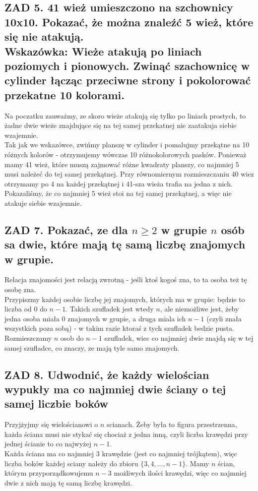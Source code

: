 \documentclass{article}
\begin{document}
\subsection*{ZAD 5. 41 wież umieszczono na szchownicy 10x10. Pokazać, że można znaleźć 5 wież, które się nie atakują.\\Wskazówka: Wieże atakują po liniach poziomych i pionowych. Zwinąć szachownicę w cylinder łącząc przeciwne strony i pokolorować przekatne 10 kolorami.}
Na poczatku zauważmy, ze skoro wieże atakują się tylko po liniach prostych, to żadne dwie wieże znajdujące się na tej samej przekatnej nie zaatakuja siebie wzajemnie.\\
Tak jak we wskazówce, zwińmy planszę w cylinder i pomalujmy przekątne na 10 różnych kolorów - otrzymujemy wówczas 10 różnokolorowych pasków. Ponieważ mamy 41 wież, które muszą zajmować różne kwadraty planszy, co najmniej 5 musi należeć do tej samej przekątnej. Przy równomiernym rozmieszczaniu 40 wiez otrzymamy po 4 na każdej przekątnej i 41-sza wieża trafia na jedna z nich.\\
Pokazaliśmy, że co najmniej 5 wież stoi na tej samej przekątnej, a więc nie atakuje siebie wzajemnie.
\newpage
\subsection*{ZAD 7. Pokazać, ze dla $n\geq2$ w grupie $n$ osób sa dwie, które mają tę samą liczbę znajomych w grupie.}
  Relacja znajomości jest relacją zwrotną - jeśli ktoś kogoś zna, to ta osoba też tę osobę zna.\\
  Przypiszmy każdej osobie liczbę jej znajomych, których ma w grupie: będzie to liczba od 0 do $n-1$. Takich szufladek jest wtedy $n$, ale niemożliwe jest, żeby jedna osoba miała 0 znajomych w grupie, a druga miala ich $n-1$ (czyli znała wszystkich poza sobą) - w takim razie ktoraś z tych szufladek bedzie pusta. \\
  Rozmieszczamy $n$ osob do $n-1$ szufladek, wiec co najmniej dwie znajdą się w tej samej szufladce, co znaczy, ze mają tyle samo znajomych.
\newpage
\subsection*{ZAD 8. Udwodnić, że każdy wielościan wypukły ma co najmniej dwie ściany o tej samej liczbie boków}
  Przyjżyjmy się wielościanowi o $n$ scianach. Żeby była to figura przestrzenna, każda ściana musi nie stykać się chociaż z jedna inną, czyli liczba krawędzi przy jednej ścianie to co najwyżej $n-1$.\\
  Każda ściana ma co najmniej 3 krawędzie (jest co najmniej trójkątem), więc liczba boków każdej sciany należy do zbioru $\{3, 4, ..., n-1\}$. Mamy $n$ ścian, którym przyporządkowujemu $n-3$ możliwych ilości krawędzi, więc co najmniej dwie z nich mają tę samą liczbę krawędzi.
\newpage
\end{document}
